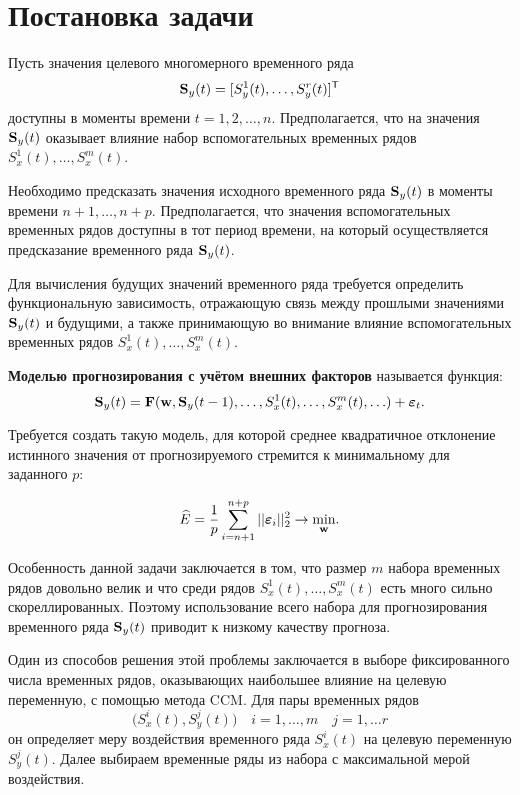 \documentclass[a4paper, 12pt]{article}
\begin{document}
\section{Постановка задачи}
Пусть значения целевого многомерного временного ряда 
\[\mathbf{S}_y(t) = [S_y^1(t), \ldots, S_y^r(t)]^{\mathsf{T}}\]
доступны в моменты времени $t = 1, 2, \ldots, n$. Предполагается, что на значения $\mathbf{S}_y(t)$ оказывает влияние набор вспомогательных временных рядов $S_x^1(t), \ldots, S_x^m(t)$.

Необходимо предсказать значения исходного временного ряда $\mathbf{S}_y(t)$ в моменты времени $n+1, \ldots, n+p$. 
Предполагается, что значения вспомогательных временных рядов доступны в тот период времени, на который осуществляется предсказание временного ряда $\mathbf{S}_y(t)$.

Для вычисления будущих значений временного ряда требуется определить функциональную зависимость, отражающую связь между прошлыми значениями $\mathbf{S}_y(t)$ и будущими, а также принимающую во внимание влияние вспомогательных временных рядов $S_x^1(t), \ldots, S_x^m(t)$.

\begin{definition}
	\textbf{Моделью прогнозирования с учётом внешних факторов} называется функция:
	\begin{equation*}
		\mathbf{S}_y(t) = \mathbf{F}(\mathbf{w}, \mathbf{S}_y(t-1), \ldots, S_x^1(t), \ldots, S_x^m(t), \ldots) + \boldsymbol{\varepsilon}_t.
	\end{equation*}
\end{definition}

Требуется создать такую модель, для которой среднее квадратичное отклонение истинного значения от прогнозируемого стремится к минимальному для заданного $p$: 

\begin{equation*}
	\widehat{E} = \dfrac{1}{p} \sum\limits_{i=n+1}^{n+p} ||\boldsymbol{\varepsilon}_i||_2^2 \rightarrow \underset{\mathbf{w}}{\text{min}}.
\end{equation*}

Особенность данной задачи заключается в том, что размер $m$ набора временных рядов довольно велик и что среди рядов $S_x^1(t), \ldots, S_x^m(t)$ есть много сильно скореллированных. 
Поэтому использование всего набора для прогнозирования временного ряда $\mathbf{S}_y(t)$ приводит к низкому качеству прогноза. 

Один из способов решения этой проблемы заключается в выборе фиксированного числа временных рядов, оказывающих наибольшее влияние на целевую переменную, с помощью метода CCM. 
Для пары временных рядов
\begin{equation*}
\bigl(S_x^i(t), S_y^j(t) \bigr) \quad i = 1, \ldots, m \quad j = 1, \ldots r
\end{equation*} 
он определяет меру воздействия временного ряда $S_x^i(t)$ на целевую переменную $S_y^j(t)$. 
Далее выбираем временные ряды из набора с максимальной мерой воздействия.
\end{document}
